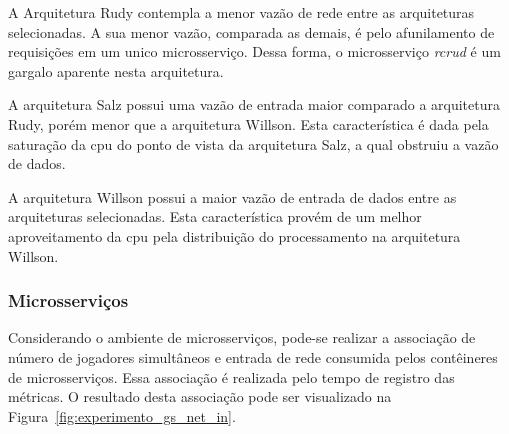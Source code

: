 A Arquitetura Rudy contempla a menor vazão de rede entre as arquiteturas selecionadas.
%
A sua menor vazão, comparada as demais, é pelo afunilamento de requisições em um unico microsserviço.
%
Dessa forma, o microsserviço \textit{rcrud} é um gargalo aparente nesta arquitetura.

A arquitetura Salz possui uma vazão de entrada maior comparado a arquitetura Rudy, porém menor que a arquitetura Willson.
%
Esta característica é dada pela saturação da \ac{cpu} do ponto de vista da arquitetura Salz, a qual obstruiu a vazão de dados.

A arquitetura Willson possui a maior vazão de entrada de dados entre as arquiteturas selecionadas.
%
Esta característica provém de um melhor aproveitamento da \ac{cpu} pela distribuição do processamento na arquitetura Willson.


\subsubsection{Microsserviços}

Considerando o ambiente de microsserviços, pode-se realizar a associação de número de jogadores simultâneos e entrada de rede consumida pelos contêineres de microsserviços.
%
Essa associação é realizada pelo tempo de registro das métricas.
%
O resultado desta associação pode ser visualizado na Figura~\ref{fig:experimento_gs_net_in}.

